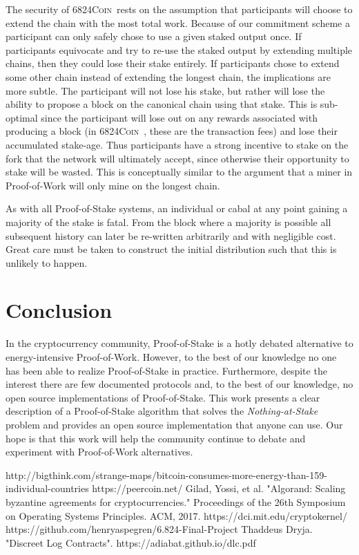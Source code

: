\documentclass{article}
\newcommand{\coin}{ \textsc{6824Coin}\ }
\begin{document}
The security of \coin rests on the assumption that participants will choose to extend the chain with the most total work. Because of our commitment scheme a participant can only safely chose to use a given staked output once. If participants equivocate and try to re-use the staked output by extending multiple chains, then they could lose their stake entirely. If participants chose to extend some other chain instead of extending the longest chain, the implications are more subtle. The participant will not lose his stake, but rather will lose the ability to propose a block on the canonical chain using that stake. This is sub-optimal since the participant will lose out on any rewards associated with producing a block (in \coin, these are the transaction fees) and lose their accumulated stake-age. Thus participants have a strong incentive to stake on the fork that the network will ultimately accept, since otherwise their opportunity to stake will be wasted. This is conceptually similar to the argument that a miner in Proof-of-Work will only mine on the longest chain. 

As with all Proof-of-Stake systems, an individual or cabal at any point gaining a majority of the stake is fatal. From the block where a majority is possible all subsequent history can later be re-written arbitrarily and with negligible cost. Great care must be taken to construct the initial distribution such that this is unlikely to happen.

\section{Conclusion}
In the cryptocurrency community, Proof-of-Stake is a hotly debated alternative to energy-intensive Proof-of-Work. However, to the best of our knowledge no one has been able to realize Proof-of-Stake in practice. Furthermore, despite the interest there are few documented protocols and, to the best of our knowledge, no open source implementations of Proof-of-Stake. This work presents a clear description of a Proof-of-Stake algorithm that solves the \textit{Nothing-at-Stake} problem and provides an open source implementation that anyone can use. Our hope is that this work will help the community continue to debate and experiment with Proof-of-Work alternatives.    


\begin{thebibliography}{9}
http://bigthink.com/strange-maps/bitcoin-consumes-more-energy-than-159-individual-countries
https://peercoin.net/
Gilad, Yossi, et al. "Algorand: Scaling byzantine agreements for cryptocurrencies." Proceedings of the 26th Symposium on Operating Systems Principles. ACM, 2017.
https://dci.mit.edu/cryptokernel/
https://github.com/henryaspegren/6.824-Final-Project
 Thaddeus Dryja. "Discreet Log Contracts". https://adiabat.github.io/dlc.pdf
\end{thebibliography}
\end{document}
